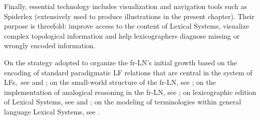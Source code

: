 Finally, essential technology includes visualization and navigation tools such as Spiderlex (extensively used to produce illustrations in the present chapter). Their purpose is threefold: improve access to the content of Lexical Systems, visualize complex topological information and help lexicographers diagnose missing or wrongly encoded information.

\begin{furtherreading}
On the strategy adopted to organize the fr-LN's initial growth based on the encoding of standard paradigmatic LF relations that are central in the system of LFs,\footnotemark\ see \textcite{LuxPogodallaPolguere2011} and \textcite{PolguereSikora2013a-e}; on the small-world structure of the fr-LN, see \textcite{GaderEtAl2014a-e}; on the implementation of analogical reasoning in the fr-LN, see \textcite{Ollinger2014-e}; on lexicographic edition of Lexical Systems, see \textcite{GaderEtAl2012} and \textcite{Polguere2012e-e}; on the modeling of terminologies within general language Lexical Systems, see \textcite{GotkovaEtAl2024}.
\end{furtherreading}


\clearpage{\pagestyle{empty}\cleardoublepage}
